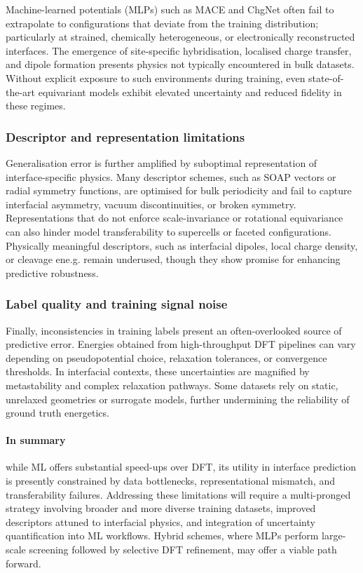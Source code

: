 Machine-learned potentials (MLPs) such as MACE and ChgNet often fail to extrapolate to configurations that deviate from the training distribution; particularly at strained, chemically heterogeneous, or electronically reconstructed interfaces. The emergence of site-specific hybridisation, localised charge transfer, and dipole formation presents physics not typically encountered in bulk datasets. Without explicit exposure to such environments during training, even state-of-the-art equivariant models exhibit elevated uncertainty and reduced fidelity in these regimes. 
 
\subsubsection{Descriptor and representation limitations} 
 
Generalisation error is further amplified by suboptimal representation of interface-specific physics. Many descriptor schemes, such as SOAP vectors or radial symmetry functions, are optimised for bulk periodicity and fail to capture interfacial asymmetry, vacuum discontinuities, or broken symmetry. Representations that do not enforce scale-invariance or rotational equivariance can also hinder model transferability to supercells or faceted configurations. Physically meaningful descriptors, such as interfacial dipoles, local charge density, or cleavage ene.g. remain underused, though they show promise for enhancing predictive robustness. 
 
\subsubsection{Label quality and training signal noise} 
 
Finally, inconsistencies in training labels present an often-overlooked source of predictive error. Energies obtained from high-throughput DFT pipelines can vary depending on pseudopotential choice, relaxation tolerances, or convergence thresholds. In interfacial contexts, these uncertainties are magnified by metastability and complex relaxation pathways. Some datasets rely on static, unrelaxed geometries or surrogate models, further undermining the reliability of ground truth energetics. 
 
\paragraph{In summary} while ML offers substantial speed-ups over DFT, its utility in interface prediction is presently constrained by data bottlenecks, representational mismatch, and transferability failures. Addressing these limitations will require a multi-pronged strategy involving broader and more diverse training datasets, improved descriptors attuned to interfacial physics, and integration of uncertainty quantification into ML workflows. Hybrid schemes, where MLPs perform large-scale screening followed by selective DFT refinement, may offer a viable path forward. 
 
